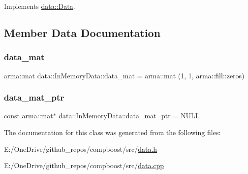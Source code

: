 Implements \mbox{\hyperlink{classdata_1_1_data_a0e928c49b31f803e7984cc24e2f73f70}{data\+::\+Data}}.



\subsection{Member Data Documentation}
\mbox{\label{classdata_1_1_in_memory_data_a16d9adacd263125f72fac8717c2ee62b}} 
\subsubsection{\texorpdfstring{data\+\_\+mat}{data\_mat}}
{\footnotesize\ttfamily arma\+::mat data\+::\+In\+Memory\+Data\+::data\+\_\+mat = arma\+::mat (1, 1, arma\+::fill\+::zeros)\hspace{0.3cm}{\ttfamily [private]}}

\mbox{\label{classdata_1_1_in_memory_data_a5c84c30085f5615c9014cba217b6caed}} 
\subsubsection{\texorpdfstring{data\+\_\+mat\+\_\+ptr}{data\_mat\_ptr}}
{\footnotesize\ttfamily const arma\+::mat$\ast$ data\+::\+In\+Memory\+Data\+::data\+\_\+mat\+\_\+ptr = N\+U\+LL\hspace{0.3cm}{\ttfamily [private]}}



The documentation for this class was generated from the following files\+:\begin{DoxyCompactItemize}
\item 
E\+:/\+One\+Drive/github\+\_\+repos/compboost/src/\mbox{\hyperlink{data_8h}{data.\+h}}\item 
E\+:/\+One\+Drive/github\+\_\+repos/compboost/src/\mbox{\hyperlink{data_8cpp}{data.\+cpp}}\end{DoxyCompactItemize}
